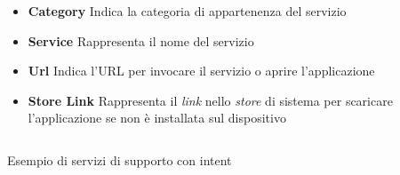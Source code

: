 \begin{itemize}
	\item \textbf{Category}
	Indica la categoria di appartenenza del servizio
	\item \textbf{Service}
	Rappresenta il nome del servizio
	\item \textbf{Url}
	Indica l'URL per invocare il servizio o aprire l'applicazione
	\item \textbf{Store Link}
	Rappresenta il \emph{link} nello \emph{store} di sistema per scaricare l'ap\-pli\-ca\-zio\-ne se non è installata sul dispositivo  
\end{itemize}

\begin{listing}[h]
	\inputminted{json}{6-implementazione-app/Codice/esempio_supporto_app.json}
	\caption{Esempio di servizi di supporto con intent}
	\label{lst:esempio-support-app}
\end{listing}